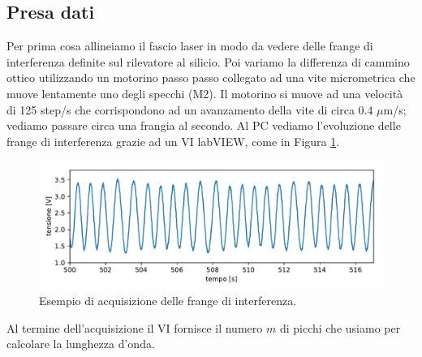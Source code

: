 \documentclass[a4paper]{article}
\begin{document}
\subsection{Presa dati}
Per prima cosa allineiamo il fascio laser in modo da vedere delle frange di interferenza definite sul rilevatore al silicio. 
Poi variamo la differenza di cammino ottico utilizzando un motorino passo passo collegato ad una vite micrometrica che muove lentamente uno degli specchi (M2). Il motorino si muove ad una velocità di 125 step/s che corrispondono ad un avanzamento della vite di circa 0.4 $\mu$m/s; vediamo passare circa una frangia al secondo.
Al PC vediamo l'evoluzione delle frange di interferenza grazie ad un VI labVIEW, come in Figura \ref{fig:esempio_acquisizione}.
\begin{figure}[H]
	\includegraphics[width=1\textwidth]{esempio_acquisizione.pdf}
	\caption{Esempio di acquisizione delle frange di interferenza.}
	\label{fig:esempio_acquisizione}
\end{figure}
Al termine dell'acquisizione il VI fornisce il numero $m$ di picchi che usiamo per calcolare la lunghezza d'onda.
\end{document}
